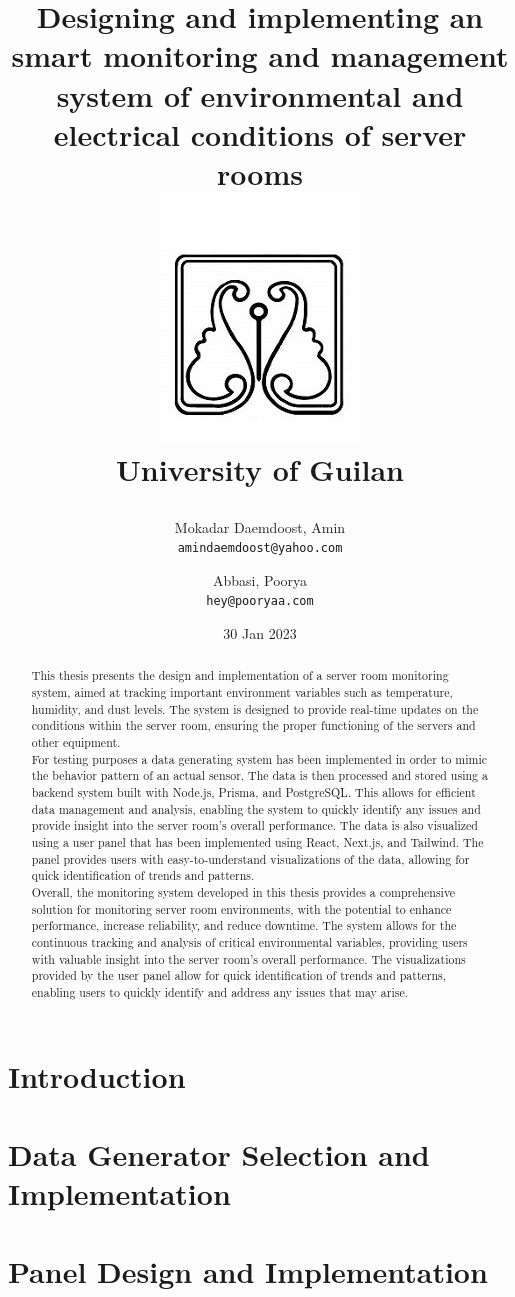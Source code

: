 \documentclass[12pt,twoside]{report}
\title{
{Designing and implementing an smart monitoring and management system of environmental and electrical conditions of server rooms
    }\\
    {\includegraphics{logo.jpg}}\\
    {\large University of Guilan}

}
\author{
  Mokadar Daemdoost, Amin\\
  \texttt{amindaemdoost@yahoo.com}
  \and
  Abbasi, Poorya\\
  \texttt{hey@pooryaa.com}
}
\date{30 Jan 2023}
\begin{document}
\fancyhead{}
\fancyfoot{}
\fancyfoot[LE,RO]{\thepage}
    \maketitle
    \begin{abstract}
      This thesis presents the design and implementation of a server room monitoring system, aimed at tracking important environment variables such as temperature, humidity, and dust levels. The system is designed to provide real-time updates on the conditions within the server room, ensuring the proper functioning of the servers and other equipment.\\

      For testing purposes a data generating system has been implemented in order to mimic the behavior pattern of an actual sensor. The data is then processed and stored using a backend system built with Node.js, Prisma, and PostgreSQL. This allows for efficient data management and analysis, enabling the system to quickly identify any issues and provide insight into the server room's overall performance. The data is also visualized using a user panel that has been implemented using React, Next.js, and Tailwind. The panel provides users with easy-to-understand visualizations of the data, allowing for quick identification of trends and patterns.\\
      
      Overall, the monitoring system developed in this thesis provides a comprehensive solution for monitoring server room environments, with the potential to enhance performance, increase reliability, and reduce downtime. The system allows for the continuous tracking and analysis of critical environmental variables, providing users with valuable insight into the server room's overall performance. The visualizations provided by the user panel allow for quick identification of trends and patterns, enabling users to quickly identify and address any issues that may arise.\\
      
    \end{abstract}
    \tableofcontents

    \chapter{Introduction}
    

    \chapter{Data Generator Selection and Implementation}
    

    \chapter{Panel Design and Implementation}
    





\end{document}
